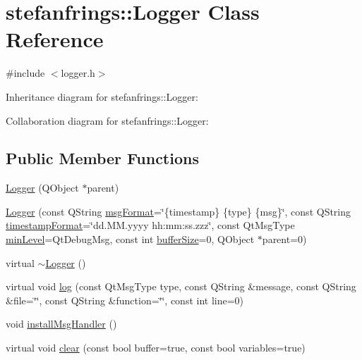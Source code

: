 \hypertarget{classstefanfrings_1_1_logger}{}\section{stefanfrings\+:\+:Logger Class Reference}
\label{classstefanfrings_1_1_logger}


{\ttfamily \#include $<$logger.\+h$>$}



Inheritance diagram for stefanfrings\+:\+:Logger\+:


Collaboration diagram for stefanfrings\+:\+:Logger\+:
\subsection*{Public Member Functions}
\begin{DoxyCompactItemize}
\item 
\mbox{\hyperlink{classstefanfrings_1_1_logger_a002e7ed636e30aa9fa73bc08b96201d3}{Logger}} (Q\+Object $\ast$parent)
\item 
\mbox{\hyperlink{classstefanfrings_1_1_logger_a19e368e5763fed782f90588f277877fb}{Logger}} (const Q\+String \mbox{\hyperlink{classstefanfrings_1_1_logger_ab7dada738f69e822329edd76889bb758}{msg\+Format}}=\char`\"{}\{timestamp\} \{type\} \{msg\}\char`\"{}, const Q\+String \mbox{\hyperlink{classstefanfrings_1_1_logger_a04eed4523912a75a31d75589f9eb81db}{timestamp\+Format}}=\char`\"{}dd.\+M\+M.\+yyyy hh\+:mm\+:ss.\+zzz\char`\"{}, const Qt\+Msg\+Type \mbox{\hyperlink{classstefanfrings_1_1_logger_a032b8dabe616327d58e97b1a5c853f86}{min\+Level}}=Qt\+Debug\+Msg, const int \mbox{\hyperlink{classstefanfrings_1_1_logger_a9e6f76da976e3f09962c7613ad7aad8a}{buffer\+Size}}=0, Q\+Object $\ast$parent=0)
\item 
virtual \mbox{\hyperlink{classstefanfrings_1_1_logger_acb668a9e186a25fbaad2e4af6d1ed00a}{$\sim$\+Logger}} ()
\item 
virtual void \mbox{\hyperlink{classstefanfrings_1_1_logger_af731fc45cf731695d5f971472032190d}{log}} (const Qt\+Msg\+Type type, const Q\+String \&message, const Q\+String \&file=\char`\"{}\char`\"{}, const Q\+String \&function=\char`\"{}\char`\"{}, const int line=0)
\item 
void \mbox{\hyperlink{classstefanfrings_1_1_logger_a333125f7ac75da148f3345ad4e5c49f3}{install\+Msg\+Handler}} ()
\item 
virtual void \mbox{\hyperlink{classstefanfrings_1_1_logger_a4dc933a2f38098fc539f7e17fc39da41}{clear}} (const bool buffer=true, const bool variables=true)
\end{DoxyCompactItemize}
